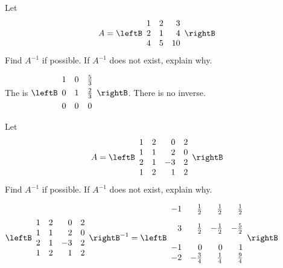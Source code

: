 \begin{enumialphparenastyle}
\begin{ex}Let
\begin{equation*}
A=\leftB
\begin{array}{rrr}
1 & 2 & 3 \\
2 & 1 & 4 \\
4 & 5 & 10
\end{array}
\rightB 
\end{equation*}
Find $A^{-1}$ if possible. If $A^{-1}$ does not exist, explain why. 
\begin{sol}
The \rref\; is 
$\leftB
\begin{array}{ccc}
1 & 0 & \vspace{0.05in}\frac{5}{3} \\
0 & 1 & \vspace{0.05in}\frac{2}{3} \\
0 & 0 & 0
\end{array}
\rightB$. There is no inverse.
\end{sol}
\end{ex}

\begin{ex}Let
\begin{equation*}
A=\leftB
\begin{array}{rrrr}
1 & 2 & 0 & 2 \\
1 & 1 & 2 & 0 \\
2 & 1 & -3 & 2 \\
1 & 2 & 1 & 2
\end{array}
\rightB
\end{equation*}
Find $A^{-1}$ if possible. If $A^{-1}$ does not exist, explain why.
\begin{sol}
$\leftB
\begin{array}{rrrr}
1 & 2 & 0 & 2 \\
1 & 1 & 2 & 0 \\
2 & 1 & -3 & 2 \\
1 & 2 & 1 & 2
\end{array}
\rightB^{-1}= \leftB
\begin{array}{rrrr}
-1 & \vspace{0.05in}\frac{1}{2} &  \vspace{0.05in}\frac{1}{2} &  \vspace{0.05in}\frac{1}{2} \\
3 &  \vspace{0.05in}\frac{1}{2} & - \vspace{0.05in}\frac{1}{2} & - \vspace{0.05in}\frac{5}{2} \\
-1 & 0 & 0 & 1 \\
-2 & - \vspace{0.05in}\frac{3}{4} &  \vspace{0.05in}\frac{1}{4} &  \vspace{0.05in}\frac{9}{4}
\end{array}
\rightB$
\end{sol}
\end{ex}


\end{enumialphparenastyle}
